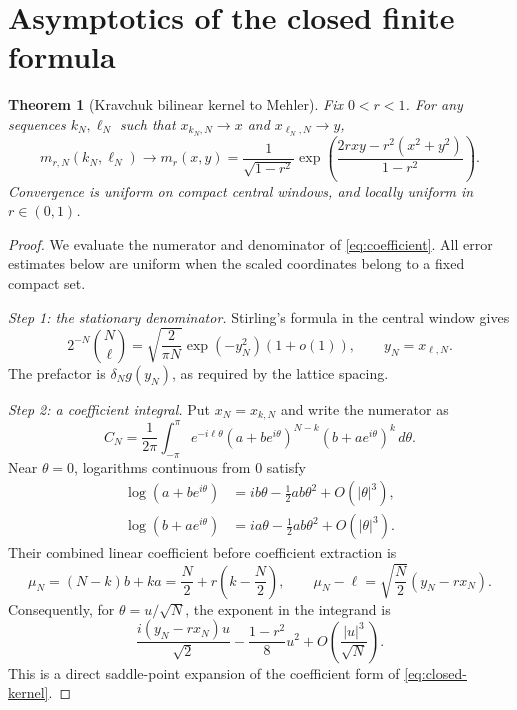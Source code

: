 \documentclass[11pt,reqno]{amsart}
\newtheorem{theorem}{Theorem}[section]
\theoremstyle{remark}\newtheorem{remark}[theorem]{Remark}
\begin{document}
\section{Asymptotics of the closed finite formula}
\begin{theorem}[Kravchuk bilinear kernel to Mehler]\label{thm:limit}
Fix $0<r<1$. For any sequences $k_N,\ell_N$ such that
$x_{k_N,N}\to x$ and $x_{\ell_N,N}\to y$,
\begin{equation}\label{eq:mehler-ratio}
\boxed{\displaystyle
m_{r,N}(k_N,\ell_N)\longrightarrow
m_r(x,y)=\frac1{\sqrt{1-r^2}}
\exp\left(\frac{2rxy-r^2(x^2+y^2)}{1-r^2}\right).}
\end{equation}
Convergence is uniform on compact central windows, and locally uniform
in $r\in(0,1)$.
\end{theorem}
\begin{proof}
We evaluate the numerator and denominator of \eqref{eq:coefficient}.
All error estimates below are uniform when the scaled coordinates
belong to a fixed compact set.

\smallskip\noindent\emph{Step 1: the stationary denominator.}
Stirling's formula in the central window gives
\begin{equation}\label{eq:binomial-asym}
2^{-N}\binom N\ell
=\sqrt{\frac2{\pi N}}\exp(-y_N^2)(1+o(1)),
\qquad y_N=x_{\ell,N}.
\end{equation}
The prefactor is $\delta_Ng(y_N)$, as required by the lattice spacing.

\smallskip\noindent\emph{Step 2: a coefficient integral.}
Put $x_N=x_{k,N}$ and write the numerator as
\begin{equation}\label{eq:integral}
C_N=\frac1{2\pi}\int_{-\pi}^{\pi}
e^{-i\ell\theta}(a+be^{i\theta})^{N-k}
(b+ae^{i\theta})^k\,d\theta.
\end{equation}
Near $\theta=0$, logarithms continuous from $0$ satisfy
\[
\begin{aligned}
\log(a+be^{i\theta})&=ib\theta-\tfrac12ab\theta^2+O(|\theta|^3),\\
\log(b+ae^{i\theta})&=ia\theta-\tfrac12ab\theta^2+O(|\theta|^3).
\end{aligned}
\]
Their combined linear coefficient before coefficient extraction is
\[
\mu_N=(N-k)b+ka=\frac N2+r\left(k-\frac N2\right),
\qquad
\mu_N-\ell=\sqrt{\frac N2}(y_N-rx_N).
\]
Consequently, for $\theta=u/\sqrt N$, the exponent in the integrand is
\begin{equation}\label{eq:local-exponent}
\frac{i(y_N-rx_N)u}{\sqrt2}
-\frac{1-r^2}{8}u^2+O\left(\frac{|u|^3}{\sqrt N}\right).
\end{equation}
This is a direct saddle-point expansion of the coefficient form of
\eqref{eq:closed-kernel}.


\end{proof}
\end{document}
